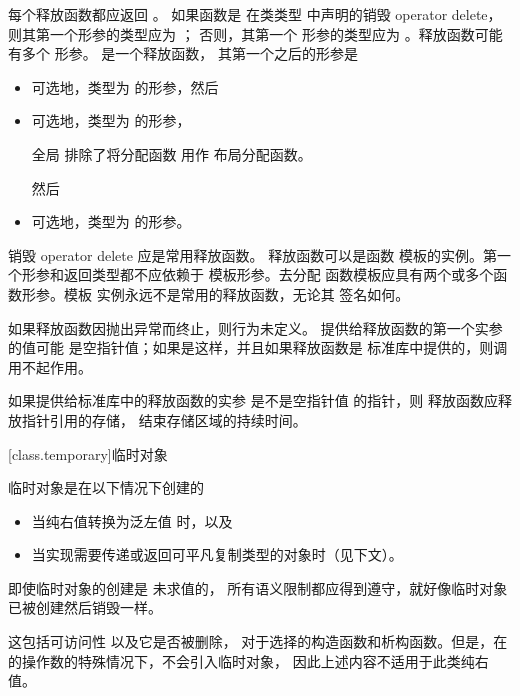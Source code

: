 \pnum
{}%
每个释放函数都应返回 。
如果函数是
在类类型  中声明的销毁 operator delete，
则其第一个形参的类型应为 ；
否则，其第一个
形参的类型应为 。释放函数可能有多个
形参。
%
 是一个释放函数，
其第一个之后的形参是
\begin{itemize}
\item
可选地，类型为  的形参，然后
\item
可选地，类型为  的形参，
\begin{footnote}
全局 
排除了将分配函数  用作
布局分配函数。
\end{footnote}
然后
\item
可选地，类型为  的形参。
\end{itemize}
销毁 operator delete 应是常用释放函数。
释放函数可以是函数
模板的实例。第一个形参和返回类型都不应依赖于
模板形参。去分配
函数模板应具有两个或多个函数形参。模板
实例永远不是常用的释放函数，无论其
签名如何。

\pnum
如果释放函数因抛出异常而终止，则行为未定义。
提供给释放函数的第一个实参的值可能
是空指针值；如果是这样，并且如果释放函数是
标准库中提供的，则调用不起作用。

\pnum
如果提供给标准库中的释放函数的实参
是不是空指针值 的指针，则
释放函数应释放指针引用的存储，
结束存储区域的持续时间。

[class.temporary]{临时对象}

\pnum
{}%
%
%
%
%
临时对象是在以下情况下创建的
\begin{itemize}
\item
当纯右值转换为泛左值 时，以及
\item
当实现需要传递或返回可平凡复制类型的对象时（见下文）。
\end{itemize}
即使临时对象的创建是
未求值的，
所有语义限制都应得到遵守，就好像临时对象
已被创建然后销毁一样。
\begin{note}
这包括可访问性 以及它是否被删除，
对于选择的构造函数和析构函数。但是，在
 的操作数的特殊情况下，不会引入临时对象，
因此上述内容不适用于此类纯右值。
\end{note}

